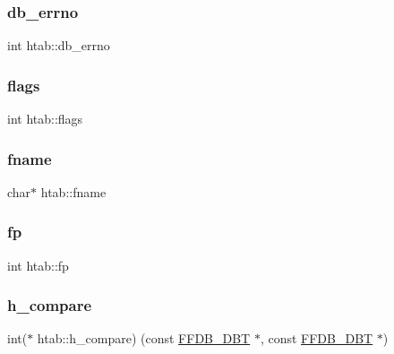 \subsubsection{\texorpdfstring{db\_errno}{db\_errno}}
{\footnotesize\ttfamily int htab\+::db\+\_\+errno}

\mbox{\label{structhtab_aec553f223cf81af78090be98b9e4a132}} 
\subsubsection{\texorpdfstring{flags}{flags}}
{\footnotesize\ttfamily int htab\+::flags}

\mbox{\label{structhtab_ab9eb75d5c77176a801994a26ea432713}} 
\subsubsection{\texorpdfstring{fname}{fname}}
{\footnotesize\ttfamily char$\ast$ htab\+::fname}

\mbox{\label{structhtab_a3d34e277d5fe6638f28fd17f0627ce10}} 
\subsubsection{\texorpdfstring{fp}{fp}}
{\footnotesize\ttfamily int htab\+::fp}

\mbox{\label{structhtab_ad5b9916241401de56f7374b6d846d1ac}} 
\subsubsection{\texorpdfstring{h\_compare}{h\_compare}}
{\footnotesize\ttfamily int($\ast$ htab\+::h\+\_\+compare) (const \mbox{\hyperlink{other__libs_2filedb_2filehash_2ffdb__db_8h_aa2e0984399491df0fdd20898ca8758f9}{F\+F\+D\+B\+\_\+\+D\+BT}} $\ast$, const \mbox{\hyperlink{other__libs_2filedb_2filehash_2ffdb__db_8h_aa2e0984399491df0fdd20898ca8758f9}{F\+F\+D\+B\+\_\+\+D\+BT}} $\ast$)}

\mbox{\label{structhtab_a6b0a7315a164a7a3a874b9784c26f865}} 
